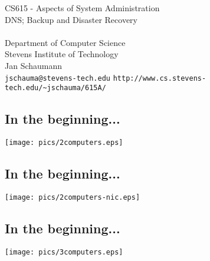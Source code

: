 \documentclass[xga]{xdvislides}
\begin{document}
\setfontphv

\lhead{\slidetitle}                               %
\cfoot{\relax}                               %
\rfoot{\Gray{\today}}

\newcommand{\smallish}{\fontsize{15}{20}\selectfont}

\vspace*{\fill}
\begin{center}
	\Hugesize
		CS615 - Aspects of System Administration\\ [1em]
		DNS; Backup and Disaster Recovery \\ [1em]
	\hspace*{5mm}\blueline\\ [1em]
	\Normalsize
		Department of Computer Science\\
		Stevens Institute of Technology\\
		Jan Schaumann\\
		\verb+jschauma@stevens-tech.edu+
		\verb+http://www.cs.stevens-tech.edu/~jschauma/615A/+
\end{center}
\vspace*{\fill}

\subsection{In the beginning...}
\vspace*{\fill}
\begin{center}
	\texttt{[image: pics/2computers.eps]} \\
\end{center}
\vspace*{\fill}

\subsection{In the beginning...}
\vspace*{\fill}
\begin{center}
	\texttt{[image: pics/2computers-nic.eps]} \\
\end{center}
\vspace*{\fill}

\subsection{In the beginning...}
\vspace*{\fill}
\begin{center}
	\texttt{[image: pics/3computers.eps]} \\
\end{center}
\vspace*{\fill}
\end{document}
